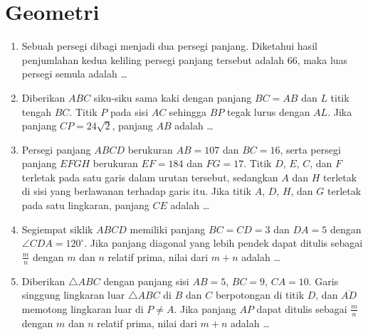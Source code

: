 \documentclass[12pt]{scrartcl}
\begin{document}
\section{Geometri}
\begin{enumerate}[resume]
	\item Sebuah persegi dibagi menjadi dua persegi panjang. Diketahui hasil penjumlahan kedua
	keliling persegi panjang tersebut adalah 66, maka luas persegi semula adalah \dots

	\item Diberikan $ABC$ siku-siku sama kaki dengan panjang $BC=AB$ dan $L$ titik tengah $BC$.
	Titik $P$ pada sisi $AC$ sehingga $BP$ tegak lurus dengan $AL$.
	Jika panjang $CP=24\sqrt{2}$, panjang $AB$ adalah \dots

	\item Persegi panjang $ABCD$ berukuran $AB=107$ dan $BC=16$,
	serta persegi panjang $EFGH$ berukuran $EF=184$ dan $FG=17$.
	Titik $D$, $E$, $C$, dan $F$ terletak pada satu garis dalam urutan tersebut,
	sedangkan $A$ dan $H$ terletak di sisi yang berlawanan terhadap garis itu.
	Jika titik $A$, $D$, $H$, dan $G$ terletak pada satu lingkaran,
	panjang $CE$ adalah \dots

	\item Segiempat siklik $ABCD$ memiliki panjang $BC=CD=3$ dan $DA=5$
	dengan $\angle CDA=120^{\circ}$.
	Jika panjang diagonal yang lebih pendek dapat ditulis sebagai $\frac{m}{n}$
	dengan $m$ dan $n$ relatif prima, nilai dari $m+n$ adalah \dots

	\item Diberikan $\triangle ABC$ dengan panjang sisi $AB=5$, $BC=9$, $CA=10$.
	Garis singgung lingkaran luar $\triangle ABC$ di $B$ dan $C$ berpotongan di titik $D$,
	dan $\overline{AD}$ memotong lingkaran luar di $P\ne A$.
	Jika panjang $AP$ dapat ditulis sebagai $\frac{m}{n}$ dengan $m$ dan $n$ relatif prima,
	nilai dari $m+n$ adalah \dots
\end{enumerate}
\end{document}
